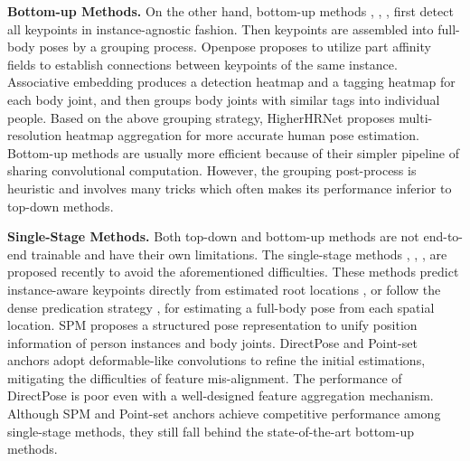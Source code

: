 \documentclass[sigconf]{acmart}
\begin{document}
\textbf{Bottom-up Methods.}\quad 
On the other hand, bottom-up methods \cite{cao2017realtime}, \cite{insafutdinov2016deepercut}, \cite{newell2016associative}, \cite{cheng2020higherhrnet} first detect all keypoints in instance-agnostic fashion.
Then keypoints are assembled into full-body poses by a grouping process.
Openpose \cite{cao2017realtime} proposes to utilize part affinity fields to establish connections between keypoints of the same instance.
Associative embedding \cite{newell2016associative} produces a detection heatmap and a tagging heatmap for each body joint, and then groups body joints with similar tags into individual people.
Based on the above grouping strategy, HigherHRNet \cite{cheng2020higherhrnet} proposes multi-resolution heatmap aggregation for more accurate human pose estimation.
Bottom-up methods are usually more efficient because of their simpler pipeline of sharing convolutional computation.
However, the grouping post-process is heuristic and involves many tricks which often makes its performance inferior to top-down methods.

\textbf{Single-Stage Methods.}\quad 
Both top-down and bottom-up methods are not end-to-end trainable and have their own limitations.
The single-stage methods \cite{nie2019single}, \cite{zhou2019objects}, \cite{tian2019directpose}, \cite{wei2020point} are proposed recently to avoid the aforementioned difficulties.
These methods predict instance-aware keypoints directly from estimated root locations \cite{nie2019single}, \cite{zhou2019objects} or follow the dense predication strategy \cite{wei2020point}, \cite{tian2019directpose} for estimating a full-body pose from each spatial location.
SPM \cite{nie2019single} proposes a structured pose representation to unify position information of person instances and body joints.
DirectPose \cite{tian2019directpose}
and Point-set anchors \cite{wei2020point}
adopt deformable-like convolutions to refine the initial estimations, mitigating the difficulties of feature mis-alignment.
The performance of DirectPose \cite{tian2019directpose} is poor even with a well-designed feature aggregation mechanism. 
Although SPM and Point-set anchors achieve competitive performance among single-stage methods, they still fall behind the state-of-the-art bottom-up methods.
\end{document}
